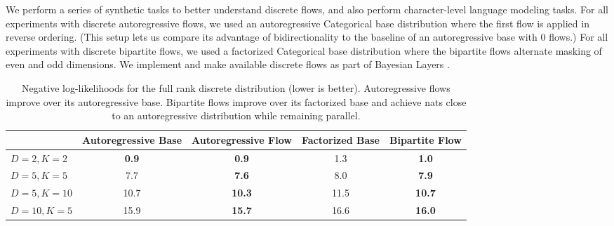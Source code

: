\documentclass{article}
\begin{document}
We perform a series of synthetic tasks to better understand discrete flows, and also perform character-level language modeling tasks. For all experiments with discrete autoregressive flows, we used an autoregressive Categorical base distribution where the first flow is applied in reverse ordering. (This setup lets us compare its advantage of bidirectionality to the baseline of an autoregressive base with 0 flows.) For all experiments with discrete bipartite flows, we used a factorized Categorical base distribution where the bipartite flows alternate masking of even and odd dimensions.
We implement and make available discrete flows as part of Bayesian Layers \citep{tran2018bayesian}.






\begin{table*}[!t]
\centering
\begin{tabular}{lcccc} \\  \toprule
& Autoregressive Base & Autoregressive Flow & Factorized Base & Bipartite Flow \\ \midrule
$D=2, K=2$  & \textbf{0.9} & \textbf{0.9} & 1.3 & \textbf{1.0} \\
$D=5, K=5$  & 7.7 & \textbf{7.6} & 8.0 & \textbf{7.9} \\
$D=5, K=10$ & 10.7 & \textbf{10.3} & 11.5 & \textbf{10.7} \\
$D=10, K=5$ & 15.9 & \textbf{15.7} & 16.6 & \textbf{16.0} \\
\bottomrule
\end{tabular}
\caption{Negative log-likelihoods for the full rank discrete distribution (lower is better). Autoregressive flows improve over its autoregressive base. Bipartite flows improve over its factorized base and achieve nats close to an autoregressive distribution while remaining parallel.}
\label{table:full_rank}
\end{table*}
\end{document}
